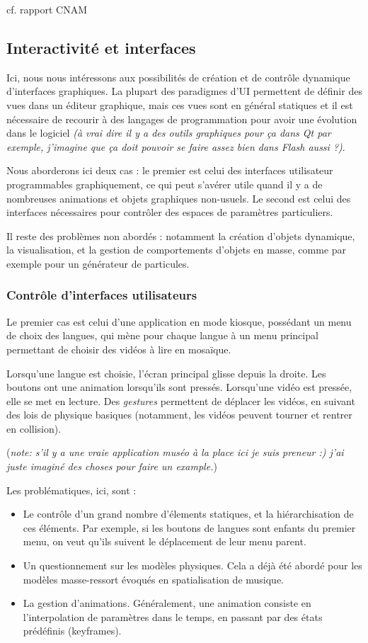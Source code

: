 \documentclass[french,12pt]{article}
\begin{document}
cf. rapport CNAM 

\subsection{Interactivité et interfaces}
Ici, nous nous intéressons aux possibilités de création et de contrôle dynamique d'interfaces graphiques. La plupart des paradigmes d'UI permettent de définir des vues dans un éditeur graphique, mais ces vues sont en général statiques et il est nécessaire de recourir à des langages de programmation pour avoir une évolution dans le logiciel \textit{(à vrai dire il y a des outils graphiques pour ça dans Qt par exemple, j'imagine que ça doit pouvoir se faire assez bien dans Flash aussi ?)}. 

Nous aborderons ici deux cas : le premier est celui des interfaces utilisateur programmables graphiquement, ce qui peut s'avérer utile quand il y a de nombreuses animations et objets graphiques non-usuels. Le second est celui des interfaces nécessaires pour contrôler des espaces de paramètres particuliers.

Il reste des problèmes non abordés : notamment la création d'objets dynamique, la visualisation, et la gestion de comportements d'objets en masse, comme par exemple pour un générateur de particules.

\subsubsection{Contrôle d'interfaces utilisateurs}
Le premier cas est celui d'une application en mode kiosque, possédant un menu de choix des langues, qui mène pour chaque langue à un menu principal permettant de choisir des vidéos à lire en mosaïque.

Lorsqu'une langue est choisie, l'écran principal glisse depuis la droite. Les boutons ont une animation lorsqu'ils sont pressés. Lorsqu'une vidéo est pressée, elle se met en lecture. Des \textit{gestures} permettent de déplacer les vidéos, en suivant des lois de physique basiques (notamment, les vidéos peuvent tourner et rentrer en collision).

(\textit{note:  s'il y a une vraie application muséo à la place ici je suis preneur :) j'ai juste imaginé des choses pour faire un example.})

Les problématiques, ici, sont : 
\begin{itemize}
\item Le contrôle d'un grand nombre d'élements statiques, et la hiérarchisation de ces éléments. Par exemple, si les boutons de langues sont enfants du premier menu, on veut qu'ils suivent le déplacement de leur menu parent.
\item Un questionnement sur les modèles physiques. Cela a déjà été abordé pour les modèles masse-ressort évoqués en spatialisation de musique.
\item La gestion d'animations. Généralement, une animation consiste en l'interpolation de paramètres dans le temps, en passant par des états prédéfinis (keyframes).
\end{itemize}
\end{document}
